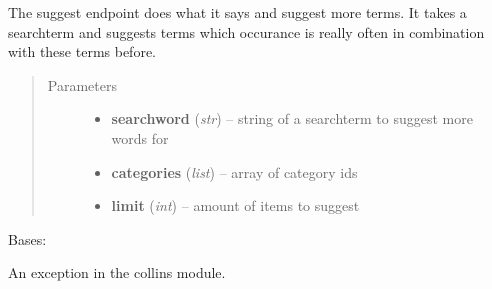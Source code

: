 \documentclass[letterpaper,10pt,english]{sphinxmanual}
\begin{document}
\begin{fulllineitems}
\begin{fulllineitems}
\begin{quote}
\begin{description}
\end{description}\end{quote}

\end{fulllineitems}


\begin{fulllineitems}
\label{collins:collins.Collins.suggest}
The suggest endpoint does what it says and suggest more terms.
It takes a searchterm and suggests terms which occurance is really
often in combination with these terms before.
\begin{quote}\begin{description}
\item[{Parameters}] \leavevmode\begin{itemize}
\item {} 
\textbf{searchword} (\emph{str}) -- string of a searchterm to suggest more words for

\item {} 
\textbf{categories} (\emph{list}) -- array of category ids

\item {} 
\textbf{limit} (\emph{int}) -- amount of items to suggest

\end{itemize}

\end{description}\end{quote}

\end{fulllineitems}


\end{fulllineitems}


\begin{fulllineitems}
\label{collins:collins.CollinsException}
Bases: 

An exception in the collins module.

\end{fulllineitems}

\end{document}
